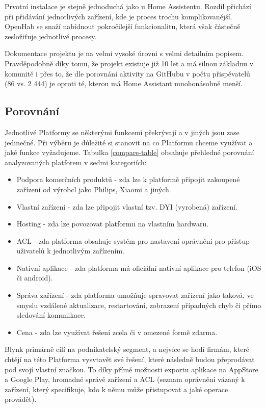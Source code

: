 Prvotní instalace je stejně jednoduchá jako u Home Assistentu. Rozdíl přichází při přidávání jednotlivých zařízení, kde je proces trochu komplikovanější. OpenHab se snaží nabídnout pokročilejší funkcionalitu, která však částečně zesložiťuje jednotlivé procesy. \cite{openhab-doc}

Dokumentace projektu je na velmi vysoké úrovni s velmi detailním popisem. Pravděpodobně díky tomu, že projekt existuje již 10 let a má silnou základnu v komunitě i přes to, že dle porovnání aktivity na GitHubu v počtu přispěvatelů (86 vs. 2 444) je oproti té, kterou má Home Assistant mnohonásobně menší.

\subsection{Porovnání}
Jednotlivé Platformy se některými funkcemi překrývají a v jiných jsou zase jedinečné. Při výběru je důležité si stanovit na co Platformu chceme využívat a jaké funkce vyžadujeme. Tabulka \ref{compare-table} obsahuje přehledné porovnání analyzovaných platforem v sedmi kategoriích:
\begin{itemize}
    \item Podpora komerčních produktů - zda lze k platformě připojit zakoupené zařízení od výrobcl jako Philips, Xiaomi a jiných.
    \item Vlastní zařízení - zda lze připojit vlastní tzv. DYI (vyrobená) zařízení.
    \item Hosting - zda lze povozovat platformu na vlastním hardwaru.
    \item ACL - zda platforma obsahuje systém pro nastavení oprávnění pro přístup uživatelů k jednotlivým zařízením.
    \item Nativní aplikace - zda platforma má oficiální nativní aplikace pro telefon (iOS či android).
    \item Správa zařízení - zda platforma umožňuje spravovat zařízení jako taková, ve smyslu vzdálené aktualizace, restartování, zobrazení případných chyb či přímo sledování komunikace.
    \item Cena - zda lze využívat řešení zcela či v omezené formě zdarma.
\end{itemize}

Blynk primárně cílí na podnikatelský segment, a nejvíce se hodí firmám, které chtějí na této Platforma vysvtavět své řešení, které následně budou přeprodávat pod svojí vlastní značkou. To díky přímé možnosti exportu aplikace na AppStore a Google Play, hromadné správě zařízení a ACL (seznam oprávnění vázaný k zařízení, který specifikuje, kdo k němu může přistupovat a jaké operace provádět).

